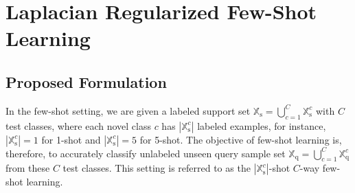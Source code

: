 \documentclass{article}
\newcommand{\XXs}{\mathbb{X}_{\text{s}}}
\newcommand{\XXq}{\mathbb{X}_{\text{q}}}
\begin{document}
\section{Laplacian Regularized Few-Shot Learning}
\subsection{Proposed Formulation}
In the few-shot setting, we are given a labeled support set $\XXs=\bigcup_{c=1}^{C} \XXs^c$ with $C$ test classes, where each novel class $c$ has $|\XXs^c|$ labeled examples, for instance, $|\XXs^c|=1$ for 1-shot and $|\XXs^c|=5$ for 5-shot. The objective of few-shot learning is, therefore, to accurately classify unlabeled unseen query sample set $\XXq=\bigcup_{c=1}^{C} \XXq^c$ from these $C$ test classes. This setting is referred to as the $|\XXs^c|$-shot $C$-way few-shot learning.
\end{document}
